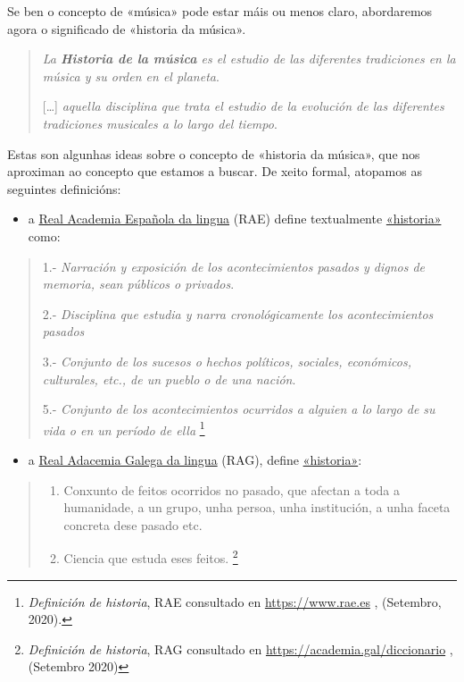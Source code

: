\documentclass[a4paper, twoside]{templates/ociamthesis}
\providecommand{\tightlist}{%
  \setlength{\itemsep}{0pt}\setlength{\parskip}{0pt}}
\begin{document}
Se ben o concepto de «música» pode estar máis ou menos claro, abordaremos agora o significado de «historia da música».

\begin{quote}
\emph{La \textbf{Historia de la música} es el estudio de las diferentes tradiciones en la música y su orden en el planeta}.

{[}\ldots{]} \emph{aquella disciplina que trata el estudio de la evolución de las diferentes tradiciones musicales a lo largo del tiempo}.
\end{quote}

Estas son algunhas ideas sobre o concepto de «historia da música», que nos aproximan ao concepto que estamos a buscar. De xeito formal, atopamos as seguintes definicións:

\begin{itemize}
\tightlist
\item
  a \href{https://dle.rae.es/}{Real Academia Española da lingua} (RAE) define textualmente \href{https://dle.rae.es/historia\#otras}{«historia»} como:
\end{itemize}

\begin{quote}
1.- \emph{Narración y exposición de los acontecimientos pasados y dignos de memoria, sean públicos o privados}.

2.- \emph{Disciplina que estudia y narra cronológicamente los acontecimientos pasados}

3.- \emph{Conjunto de los sucesos o hechos políticos, sociales, económicos, culturales, etc., de un pueblo o de una nación}.

5.- \emph{Conjunto de los acontecimientos ocurridos a alguien a lo largo de su vida o en un período de ella} \footnote{\emph{Definición de historia}, RAE consultado en \url{https://www.rae.es} , (Setembro, 2020).}
\end{quote}

\begin{itemize}
\tightlist
\item
  a \href{https://academia.gal/dicionario}{Real Adacemia Galega da lingua} (RAG), define \href{https://academia.gal/dicionario/-/termo/busca/Historia}{«historia»}:
\end{itemize}

\begin{quote}
\begin{enumerate}
\def\labelenumi{\arabic{enumi}.}
\item
  Conxunto de feitos ocorridos no pasado, que afectan a toda a humanidade, a un grupo, unha persoa, unha institución, a unha faceta concreta dese pasado etc.
\item
  Ciencia que estuda eses feitos. \footnote{\emph{Definición de historia}, RAG consultado en \url{https://academia.gal/diccionario} , (Setembro 2020)}
\end{enumerate}
\end{quote}
\end{document}

